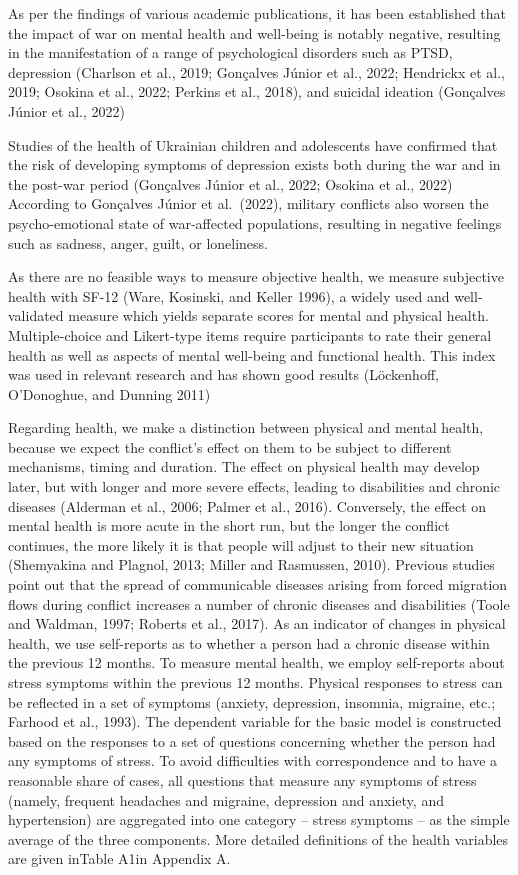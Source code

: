 \documentclass[
  letterpaper,
  DIV=11,
  numbers=noendperiod]{scrartcl}
\begin{document}
As per the findings of various academic publications, it has been
established that the impact of war on mental health and well-being is
notably negative, resulting in the manifestation of a range of
psychological disorders such as PTSD, depression (Charlson et al., 2019;
Gonçalves Júnior et al., 2022; Hendrickx et al., 2019; Osokina et al.,
2022; Perkins et al., 2018), and suicidal ideation (Gonçalves Júnior et
al., 2022)

Studies of the health of Ukrainian children and adolescents have
confirmed that the risk of developing symptoms of depression exists both
during the war and in the post-war period (Gonçalves Júnior et al.,
2022; Osokina et al., 2022) According to Gonçalves Júnior et al.~(2022),
military conflicts also worsen the psycho-emotional state of
war-affected populations, resulting in negative feelings such as
sadness, anger, guilt, or loneliness.

As there are no feasible ways to measure objective health, we measure
subjective health with SF-12 (Ware, Kosinski, and Keller 1996), a widely
used and well-validated measure which yields separate scores for mental
and physical health. Multiple-choice and Likert-type items require
participants to rate their general health as well as aspects of mental
well-being and functional health. This index was used in relevant
research and has shown good results (Löckenhoff, O'Donoghue, and Dunning
2011)

Regarding health, we make a distinction between physical and mental
health, because we expect the conflict's effect on them to be subject to
different mechanisms, timing and duration. The effect on physical health
may develop later, but with longer and more severe effects, leading to
disabilities and chronic diseases (Alderman et al., 2006; Palmer et al.,
2016). Conversely, the effect on mental health is more acute in the
short run, but the longer the conflict continues, the more likely it is
that people will adjust to their new situation (Shemyakina and Plagnol,
2013; Miller and Rasmussen, 2010). Previous studies point out that the
spread of communicable diseases arising from forced migration flows
during conflict increases a number of chronic diseases and disabilities
(Toole and Waldman, 1997; Roberts et al., 2017). As an indicator of
changes in physical health, we use self-reports as to whether a person
had a chronic disease within the previous 12 months. To measure mental
health, we employ self-reports about stress symptoms within the previous
12 months. Physical responses to stress can be reflected in a set of
symptoms (anxiety, depression, insomnia, migraine, etc.; Farhood et al.,
1993). The dependent variable for the basic model is constructed based
on the responses to a set of questions concerning whether the person had
any symptoms of stress. To avoid difficulties with correspondence and to
have a reasonable share of cases, all questions that measure any
symptoms of stress (namely, frequent headaches and migraine, depression
and anxiety, and hypertension) are aggregated into one category --
stress symptoms -- as the simple average of the three components. More
detailed definitions of the health variables are given inTable A1in
Appendix A.
\end{document}
